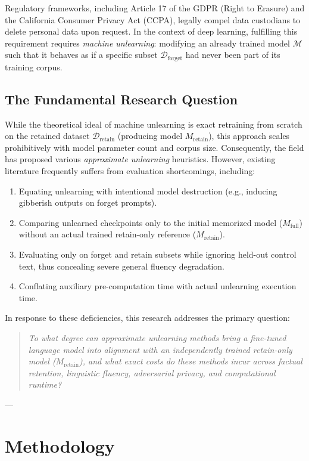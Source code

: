 \documentclass[11pt,a4paper]{article}
\begin{document}
Regulatory frameworks, including Article 17 of the GDPR (Right to Erasure) and the California Consumer Privacy Act (CCPA), legally compel data custodians to delete personal data upon request. In the context of deep learning, fulfilling this requirement requires \textit{machine unlearning}: modifying an already trained model $\mathcal{M}$ such that it behaves as if a specific subset $\mathcal{D}_{\text{forget}}$ had never been part of its training corpus.

\subsection{The Fundamental Research Question}
While the theoretical ideal of machine unlearning is exact retraining from scratch on the retained dataset $\mathcal{D}_{\text{retain}}$ (producing model $M_{\text{retain}}$), this approach scales prohibitively with model parameter count and corpus size. Consequently, the field has proposed various \textit{approximate unlearning} heuristics. However, existing literature frequently suffers from evaluation shortcomings, including:
\begin{enumerate}
    \item Equating unlearning with intentional model destruction (e.g., inducing gibberish outputs on forget prompts).
    \item Comparing unlearned checkpoints only to the initial memorized model ($M_{\text{full}}$) without an actual trained retain-only reference ($M_{\text{retain}}$).
    \item Evaluating only on forget and retain subsets while ignoring held-out control text, thus concealing severe general fluency degradation.
    \item Conflating auxiliary pre-computation time with actual unlearning execution time.
\end{enumerate}

In response to these deficiencies, this research addresses the primary question:
\begin{quote}
\textit{To what degree can approximate unlearning methods bring a fine-tuned language model into alignment with an independently trained retain-only model ($M_{\text{retain}}$), and what exact costs do these methods incur across factual retention, linguistic fluency, adversarial privacy, and computational runtime?}
\end{quote}

---

\section{Methodology}
\end{document}

